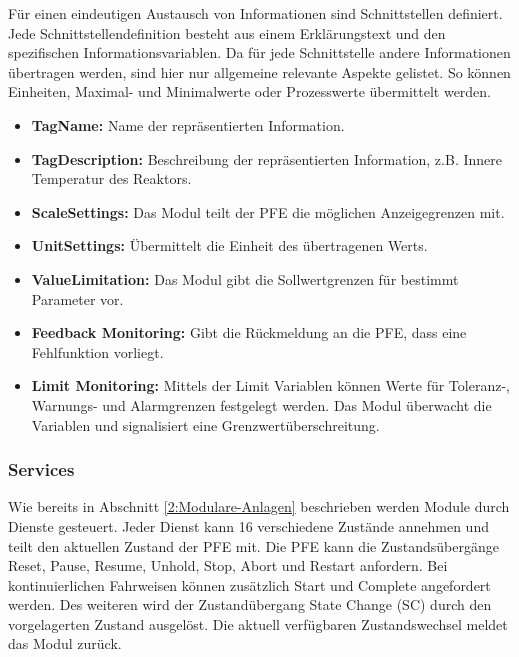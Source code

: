 Für einen eindeutigen Austausch von Informationen sind Schnittstellen definiert. Jede Schnittstellendefinition besteht aus einem Erklärungstext und den spezifischen Informationsvariablen. Da für jede Schnittstelle andere Informationen übertragen werden, sind hier nur allgemeine relevante Aspekte gelistet. So können Einheiten, Maximal- und Minimalwerte oder Prozesswerte übermittelt werden.
\begin{itemize}
\item \textbf{TagName:} Name der repräsentierten Information. 
\item \textbf{TagDescription:} Beschreibung der repräsentierten Information, z.B. Innere Temperatur des Reaktors.
\item \textbf{ScaleSettings:} Das Modul teilt der PFE die möglichen Anzeigegrenzen mit.
\item \textbf{UnitSettings:} Übermittelt die Einheit des übertragenen Werts.
\item \textbf{ValueLimitation:} Das Modul gibt die Sollwertgrenzen für bestimmt Parameter vor.
\item \textbf{Feedback Monitoring:} Gibt die Rückmeldung an die PFE, dass eine Fehlfunktion vorliegt.
\item \textbf{Limit Monitoring:} Mittels der Limit Variablen können Werte für Toleranz-, Warnungs- und Alarmgrenzen festgelegt werden. Das Modul überwacht die Variablen und signalisiert eine Grenzwertüberschreitung.
\end{itemize}

\subsubsection{Services}
Wie bereits in Abschnitt \ref{2:Modulare-Anlagen} beschrieben werden Module durch Dienste gesteuert. Jeder Dienst kann 16 verschiedene Zustände annehmen und teilt den aktuellen Zustand der PFE mit. Die PFE kann die Zustandsübergänge Reset, Pause, Resume, Unhold, Stop, Abort und Restart anfordern. Bei kontinuierlichen Fahrweisen können zusätzlich Start und Complete angefordert werden. Des weiteren wird der Zustandübergang State Change (SC) durch den vorgelagerten Zustand ausgelöst.  Die aktuell verfügbaren Zustandswechsel meldet das Modul zurück.

